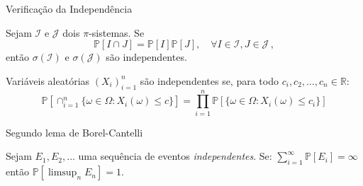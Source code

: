 \documentclass[11pt]{beamer}
\begin{document}
\begin{frame}{Verificação da Independência}
\begin{lemma}
	Sejam $\mathcal{I}$ e $\mathcal{J}$ dois $\pi$-sistemas. Se
	$$\mathbb{P}[I \cap J] = \mathbb{P}[I]\mathbb{P}[J],\quad \forall I \in \mathcal{I}, J \in \mathcal{J}\, ,$$
	então $\sigma(\mathcal{I})$ e $\sigma(\mathcal{J})$ são independentes.
\end{lemma}
\begin{corollary}
	Variáveis aleatórias $(X_i)_{i=1}^n$ são independentes se, para todo $c_i, c_2,\ldots, c_n \in \mathbb{R}$:
	$$\mathbb{P}[\cap_{i=1}^n \{\omega \in \Omega: X_i(\omega) \leq c\}] = \prod_{i=1}^n \mathbb{P}[\{\omega \in \Omega: X_i(\omega) \leq c_i\}]$$
\end{corollary}
\end{frame}


\begin{frame}{Segundo lema de Borel-Cantelli}
\begin{lemma}
	Sejam $E_1,E_2,\ldots$ uma sequência de eventos \textit{independentes}. Se:
	$\sum_{i=1}^\infty \mathbb{P}[E_i]=\infty$
	então $\mathbb{P}[\limsup_{n}E_n]=1$.
\end{lemma}
\end{frame}
\end{document}
